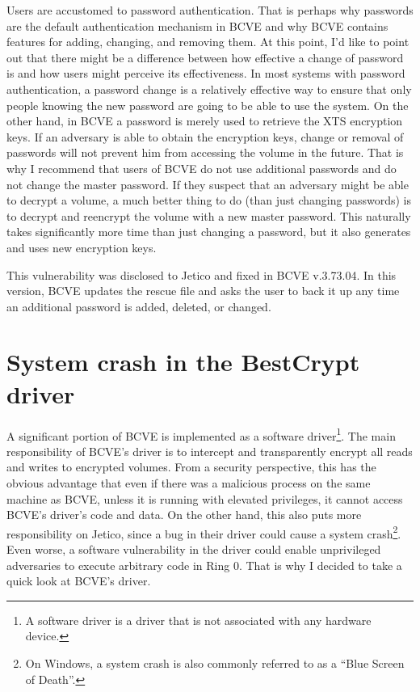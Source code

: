 \documentclass[thesis=B,english]{FITthesis}[2012/10/20]
\begin{document}
	Users are accustomed to password authentication. That is perhaps why passwords are the default authentication mechanism in BCVE and why BCVE contains features for adding, changing, and removing them. At this point, I'd like to point out that there might be a difference between how effective a change of password is and how users might perceive its effectiveness. In most systems with password authentication, a password change is a relatively effective way to ensure that only people knowing the new password are going to be able to use the system. On the other hand, in BCVE a password is merely used to retrieve the XTS encryption keys. If an adversary is able to obtain the encryption keys, change or removal of passwords will not prevent him from accessing the volume in the future. That is why I recommend that users of BCVE do not use additional passwords and do not change the master password. If they suspect that an adversary might be able to decrypt a volume, a much better thing to do (than just changing passwords) is to decrypt and reencrypt the volume with a new master password. This naturally takes significantly more time than just changing a password, but it also generates and uses new encryption keys.
	
	This vulnerability was disclosed to Jetico and fixed in BCVE v.3.73.04. In this version, BCVE updates the rescue file and asks the user to back it up any time an additional password is added, deleted, or changed.
	
	\section{System crash in the BestCrypt driver}
	
	A significant portion of BCVE is implemented as a software driver\footnote{A software driver is a driver that is not associated with any hardware device.}. The main responsibility of BCVE's driver is to intercept and transparently encrypt all reads and writes to encrypted volumes. From a security perspective, this has the obvious advantage that even if there was a malicious process on the same machine as BCVE, unless it is running with elevated privileges, it cannot access BCVE's driver's code and data. On the other hand, this also puts more responsibility on Jetico, since a bug in their driver could cause a system crash\footnote{On Windows, a system crash is also commonly referred to as a ``Blue Screen of Death''.}. Even worse, a software vulnerability in the driver could enable unprivileged adversaries to execute arbitrary code in Ring 0. That is why I decided to take a quick look at BCVE's driver.
	
\end{document}
